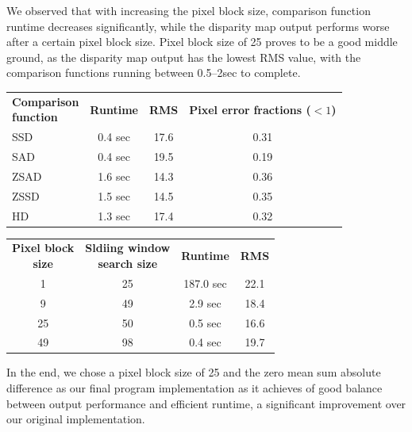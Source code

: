 \documentclass[conference]{IEEEtran}
\begin{document}
We observed that with increasing the pixel block size, comparison function runtime decreases significantly, while the disparity map output performs worse after a certain pixel block size. Pixel block size of 25 proves to be a good middle ground, as the disparity map output has the lowest RMS value, with the comparison functions running between 0.5--2sec to complete.

\begin{center}
    \begin{tabular}{l c c c}
        \pbox{4cm}{\textbf{Comparison} \\ \textbf{function}} & \textbf{Runtime} & \textbf{RMS} & \pbox{4cm}{\textbf{Pixel error} \\ \textbf{fractions ($<1$)}} \\ [2ex]
        SSD & 0.4 sec & 17.6 & 0.31 \\
        SAD & 0.4 sec & 19.5 & 0.19 \\
        ZSAD & 1.6 sec & 14.3 & 0.36 \\
        ZSSD & 1.5 sec & 14.5 & 0.35 \\
        HD & 1.3 sec & 17.4 & 0.32 
    \end{tabular}
\end{center}

\begin{center}
    \begin{tabular}{c c c c}
        \pbox{4cm}{\textbf{Pixel block} \\ \textbf{size}} & \pbox{4cm}{\textbf{Sldiing window} \\ \textbf{search size}} & \textbf{Runtime} & \textbf{RMS} \\ [2ex]
        1 & 25 & 187.0 sec & 22.1 \\
        9 & 49 & 2.9 sec & 18.4 \\
        25 & 50 & 0.5 sec & 16.6 \\
        49 & 98 & 0.4 sec & 19.7
    \end{tabular}
\end{center}

In the end, we chose a pixel block size of 25 and the zero mean sum absolute difference as our final program implementation as it achieves of good balance between output performance and efficient runtime, a significant improvement over our original implementation.
\end{document}
